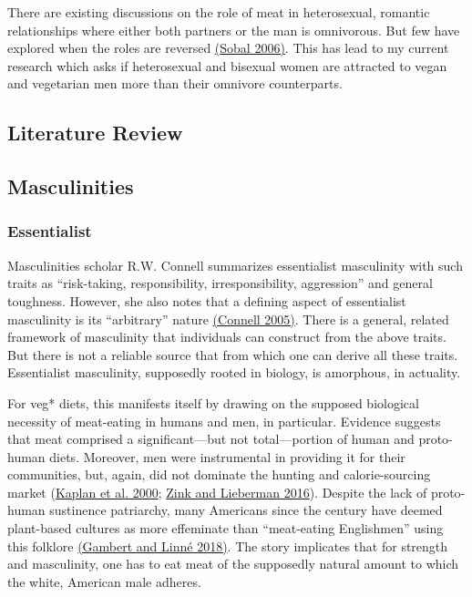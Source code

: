 \documentclass[twoside]{report}
\let\oldsection\section
\renewcommand\section{\clearpage\oldsection}
\begin{document}
There are existing discussions on the role of meat in heterosexual,
romantic relationships where either both partners or the man is
omnivorous. But few have explored when the roles are reversed \hyperlink{sobal}{(Sobal 2006)}. This has lead to my current research which asks if heterosexual and bisexual women are attracted to vegan and vegetarian men more than their omnivore counterparts.

\restoregeometry
\pagebreak

\pagestyle{fancy}
\fancyhf{}
\fancyfoot[LE,RO]{\thepage}
\begin{multicols}{2}
\section{Literature Review}

\subsection{Masculinities}

\subsubsection{Essentialist}

Masculinities scholar R.W. Connell summarizes essentialist masculinity with such traits as ``risk-taking, responsibility, irresponsibility, aggression'' and general toughness. However, she also notes that a defining aspect of
essentialist masculinity is its ``arbitrary'' nature \hyperlink{connell}{(Connell 2005)}. There is a general, related framework of masculinity that individuals can construct from the above traits. But there is not a reliable source that from which one can derive all these traits. Essentialist masculinity, supposedly rooted in biology, is amorphous, in actuality.

For veg* diets, this manifests itself by drawing on the supposed
biological necessity of meat-eating in humans and men, in particular. Evidence suggests that meat comprised a significant---but not total---portion of human and proto-human diets. Moreover, men were instrumental in providing it for their communities, but, again, did not dominate the hunting and calorie-sourcing market (\hyperlink{kaplan}{Kaplan et al. 2000}; \hyperlink{zink}{Zink and Lieberman 2016}). Despite the lack of proto-human sustinence patriarchy, many Americans since the  century have deemed plant-based cultures as more effeminate than ``meat-eating Englishmen'' using this folklore \hyperlink{gambert}{(Gambert and Linné 2018)}. The story implicates that for strength and masculinity, one has to eat meat of the supposedly natural amount to which the white, American male adheres.


\end{multicols}
\end{document}
